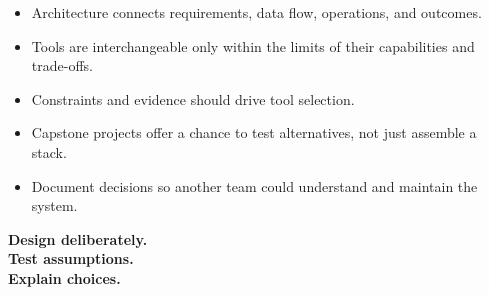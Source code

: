 \documentclass[aspectratio=43,10pt]{beamer}
\begin{document}
\begin{frame}{}
\begin{itemize}
  \item Architecture connects requirements, data flow, operations, and outcomes.
  \item Tools are interchangeable only within the limits of their capabilities and trade-offs.
  \item Constraints and evidence should drive tool selection.
  \item Capstone projects offer a chance to test alternatives, not just assemble a stack.
  \item Document decisions so another team could understand and maintain the system.
\end{itemize}
\vfill
\centering\Large \textbf{Design deliberately.\\Test assumptions.\\Explain choices.}
\end{frame}
\end{document}
